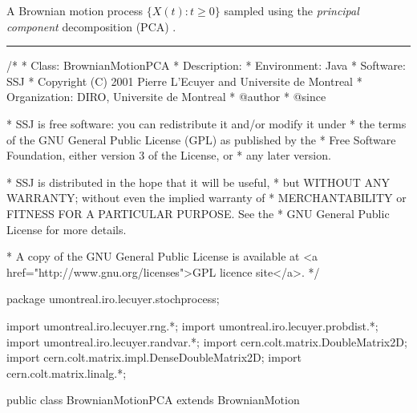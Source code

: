 
A Brownian motion process $\{X(t) : t \geq 0 \}$ sampled using the
\emph{principal component} decomposition (PCA) \cite{fGLA04a,fIMA06a,fLEC04a}.



\bigskip\hrule\bigskip

\begin{code}
\begin{hide}
/*
 * Class:        BrownianMotionPCA
 * Description:  
 * Environment:  Java
 * Software:     SSJ 
 * Copyright (C) 2001  Pierre L'Ecuyer and Universite de Montreal
 * Organization: DIRO, Universite de Montreal
 * @author       
 * @since

 * SSJ is free software: you can redistribute it and/or modify it under
 * the terms of the GNU General Public License (GPL) as published by the
 * Free Software Foundation, either version 3 of the License, or
 * any later version.

 * SSJ is distributed in the hope that it will be useful,
 * but WITHOUT ANY WARRANTY; without even the implied warranty of
 * MERCHANTABILITY or FITNESS FOR A PARTICULAR PURPOSE.  See the
 * GNU General Public License for more details.

 * A copy of the GNU General Public License is available at
   <a href="http://www.gnu.org/licenses">GPL licence site</a>.
 */
\end{hide}
package umontreal.iro.lecuyer.stochprocess;\begin{hide}
import umontreal.iro.lecuyer.rng.*;
import umontreal.iro.lecuyer.probdist.*;
import umontreal.iro.lecuyer.randvar.*;
import cern.colt.matrix.DoubleMatrix2D;
import cern.colt.matrix.impl.DenseDoubleMatrix2D;
import cern.colt.matrix.linalg.*;

\end{hide}

public class BrownianMotionPCA extends BrownianMotion \begin{hide} {

    protected double[][]  sigmaCov; // Matrice de covariance du vecteur des observ.
                                 // sigmaCov [i][j] = Cov[X(t_{i+1}),X(t_{j+1})].
    protected double[][]  A;     // sigmaCov = AA' (PCA decomposition).
    protected double[]    z;     // vector of standard normals.
    protected double[]    sortedEigenvalues;
    protected boolean     isDecompPCA;

\end{hide}
\end{code}
